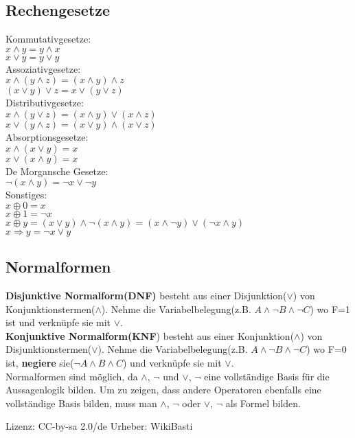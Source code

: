 \documentclass[11pt]{article}
\begin{document}
\subsection{Rechengesetze}
Kommutativgesetze:\\ $x \land y = y \land x$ \\ $x \lor y = y \lor y$ \\
Assoziativgesetze: \\ $x \land ( y \land z ) = ( x \land y ) \land z $ \\ $( x \lor y ) \lor z = x \lor( y \lor z )$ \\
Distributivgesetze: \\ $x \land ( y \lor z ) = ( x \land y ) \lor ( x \land z )$ \\  	$x \lor ( y \land z ) = ( x \lor y ) \land ( x \lor z )$ \\
Absorptionsgesetze: \\ $x \land ( x \lor y ) = x$ \\ $x \lor ( x \land y ) = x$\\
De Morgansche Gesetze: \\ $\neg ( x \land y ) = \neg x \lor \neg y$ \\
Sonstiges: \\ $x \oplus 0 = x$\\ $x \oplus 1 = \neg x$ \\ $ x \oplus y = (x \lor y) \land \neg ( x \land y ) = ( x \land \neg y ) \lor ( \neg x \land y )$ \\ $ x \Rightarrow y = \neg x \lor y $
\subsection{Normalformen}
{\bfseries Disjunktive Normalform(DNF)} besteht aus einer Disjunktion($\lor$) von Konjunktionstermen($\land$). Nehme die Variabelbelegung(z.B. $A \land \neg B \land \neg C$) wo F=1 ist und verkn{\"u}pfe sie mit $\lor$. \\
{\bfseries Konjunktive Normalform(KNF}) besteht aus einer Konjunktion($\land$) von Disjunktionstermen($\lor$). Nehme die Variabelbelegung(z.B. $A \land \neg B \land \neg C$) wo F=0 ist, {\bfseries negiere} sie($\neg A \land B \land C$) und verkn{\"u}pfe sie mit $\lor$. \\
Normalformen sind m{\"o}glich, da $\land$, $\neg$ und $\lor$, $\neg$ eine vollst{\"a}ndige Basis f{\"u}r die Aussagenlogik bilden. Um zu zeigen, dass andere Operatoren ebenfalls eine vollst{\"a}ndige Basis bilden, muss man $\land$, $\neg$ oder $\lor$, $\neg$ als Formel bilden. \\
\begin{figure}[H]
  \centering
  \def\svgwidth{400pt}
	\end{figure}\scriptsize  Lizenz: CC-by-sa 2.0{/}de Urheber: WikiBasti\normalsize \\
\end{document}
